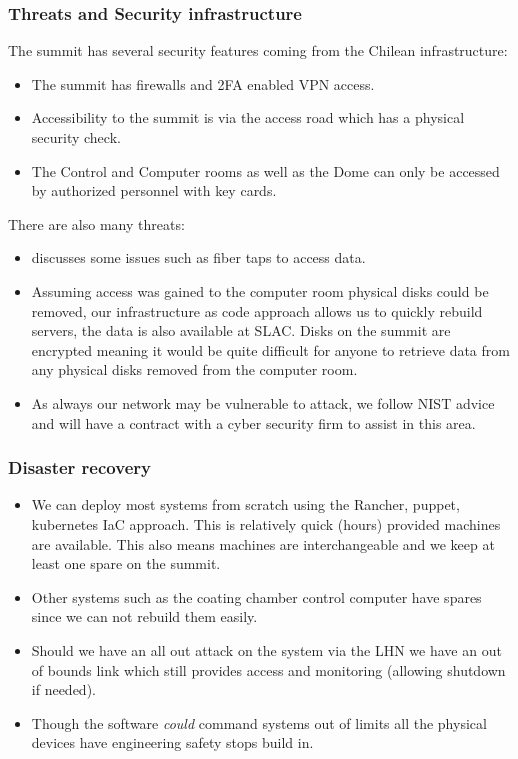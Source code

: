 \subsubsection{Threats and Security infrastructure}

The summit has several security features coming from the Chilean infrastructure:
\begin{itemize}
\item The summit has firewalls and 2FA enabled VPN access.
\item Accessibility to the summit is via the access road which has a physical security check.
\item The Control and Computer rooms as well as the Dome can only be accessed by authorized personnel with key cards.
\end{itemize}

There are also many threats:

\begin{itemize}
\item {} discusses some issues such as fiber taps to access data.
\item Assuming access was gained to the computer room physical disks could be removed, our infrastructure as code approach allows us to quickly rebuild servers, the data is also available at SLAC. Disks on the summit are encrypted meaning it would be quite difficult for anyone to retrieve data from any physical disks removed from the computer room.
\item As always our network may be vulnerable to attack, we follow NIST advice and will have a contract with a cyber security firm to assist in this area.
\end{itemize}

\subsubsection{Disaster recovery}

\begin{itemize}
\item We can deploy most systems from scratch using the Rancher, puppet, kubernetes \gls{IaC}  approach. This is relatively quick (hours) provided machines are available. This also means machines are interchangeable and we keep at least one spare on the summit.
\item Other systems such as the coating chamber control computer have spares since we can not rebuild them easily.
\item Should we have an all out attack on the system via the \gls{LHN} we have an out of bounds link which still provides access and monitoring (allowing shutdown if needed).
\item Though the software \emph{could} command systems out of limits all the physical devices have engineering safety stops build in.
\end{itemize}

